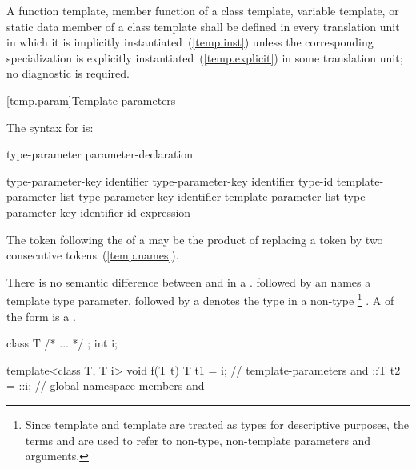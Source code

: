 \pnum
A function template, member function of a class template, variable template,
or static data
member of a class template shall be defined in every translation unit in
which it is implicitly instantiated~(\ref{temp.inst}) unless the
corresponding specialization is explicitly instantiated~(\ref{temp.explicit})
in some translation unit; no diagnostic is required.

[temp.param]{Template parameters}

\pnum
The syntax for
is:

\begin{bnf}
\br
  type-parameter\br
  parameter-declaration
\end{bnf}

\begin{bnf}
\br
  type-parameter-key \opt identifier\opt\br
  type-parameter-key identifier\opt{} \terminal{=} type-id\br
   template-parameter-list \terminal{>} type-parameter-key \opt identifier\opt\br
   template-parameter-list \terminal{>} type-parameter-key identifier\opt{} \terminal{=} id-expression
\end{bnf}

\begin{bnf}
\br
  \br
\end{bnf}

\enternote The \tcode{>} token following the
 of a
may be the product of replacing a
\tcode{>{>}} token by two consecutive \tcode{>}
tokens~(\ref{temp.names}).\exitnote

\pnum
There is no semantic difference between
and
in a
.
followed by an
names a template type parameter.
followed by a
denotes the type in a non-type%
\footnote{Since template
and template
are treated as types for descriptive purposes, the terms
and
are used to refer to non-type, non-template parameters and arguments.}
.
A  of the form
  is a .
\enterexample
\begin{codeblock}
  class T { /* ... */ };
  int i;

  template<class T, T i> void f(T t) {
    T t1 = i;      // template-parameters  and 
    ::T t2 = ::i;  // global namespace members  and 
  }
\end{codeblock}

